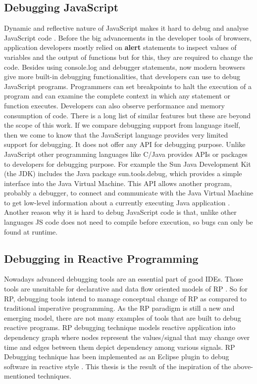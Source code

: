 \subsection{Debugging JavaScript}
Dynamic and reflective nature of JavaScript makes it hard to debug and analyse JavaScript code \cite{Richards:2010:ADB:1809028.1806598, Schafer:2012:RTD:2328876.2328885}. Before the big advancements in the developer tools of browsers, application developers mostly relied on \textbf{alert} statements to inspect values of variables and the output of functions but for this, they are required to change the code. Besides using console.log and debugger statements, now modern browsers give more built-in debugging functionalities, that developers can use to debug JavaScript programs. Programmers can set breakpoints to halt the execution of a program and can examine the complete context in which any statement or function executes. Developers can also observe performance and memory consumption of code. There is a long list of similar features but these are beyond the scope of this work.
If we compare debugging support from language itself, then we come to know that the JavaScript language provides very limited support for debugging. It does not offer any API for debugging purpose. Unlike JavaScript other programming languages like C/Java provides APIs or packages to developers for debugging purpose. For example the Sun Java Development Kit (the JDK) includes the Java package sun.tools.debug, which provides a simple interface into the Java Virtual Machine. This API allows another program, probably a debugger, to connect and communicate with the Java Virtual Machine to get low-level information about a currently executing Java application \cite{vanderburg1996tricks}. Another reason why it is hard to debug JavaScript code is that, unlike other languages JS code does not need to compile before execution, so bugs can only be found at runtime.

\subsection{Debugging in Reactive Programming}
Nowadays advanced debugging tools are an essential part of good IDEs. Those tools are unsuitable for declarative and data flow oriented models of RP \cite{Salvaneschi:2016:DRP:2884781.2884815}.
So for RP, debugging tools intend to manage conceptual change of RP as compared to traditional imperative programming. As the RP paradigm is still a new and emerging model, there are not many examples of tools that are built to debug reactive programs. 
RP debugging technique models reactive application into dependency graph where nodes represent the values/signal that may change over time and edges between them depict dependency among various signals. RP Debugging technique has been implemented as an Eclipse plugin to debug software in reactive style \cite{Salvaneschi:2016:DRP:2884781.2884815}. This thesis is the result of the inspiration of the above-mentioned techniques. 

